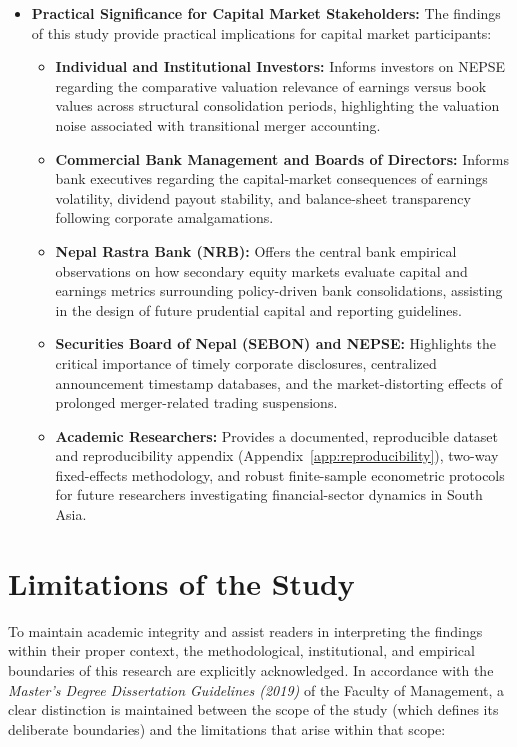 \begin{itemize}
\item \textbf{Practical Significance for Capital Market Stakeholders:}
The findings of this study provide practical implications for capital market participants:
\begin{itemize}
\item \textbf{Individual and Institutional Investors:} Informs investors on NEPSE regarding the comparative valuation relevance of earnings versus book values across structural consolidation periods, highlighting the valuation noise associated with transitional merger accounting.
\item \textbf{Commercial Bank Management and Boards of Directors:} Informs bank executives regarding the capital-market consequences of earnings volatility, dividend payout stability, and balance-sheet transparency following corporate amalgamations.
\item \textbf{Nepal Rastra Bank (NRB):} Offers the central bank empirical observations on how secondary equity markets evaluate capital and earnings metrics surrounding policy-driven bank consolidations, assisting in the design of future prudential capital and reporting guidelines.
\item \textbf{Securities Board of Nepal (SEBON) and NEPSE:} Highlights the critical importance of timely corporate disclosures, centralized announcement timestamp databases, and the market-distorting effects of prolonged merger-related trading suspensions.
\item \textbf{Academic Researchers:} Provides a documented, reproducible dataset and reproducibility appendix (Appendix~\ref{app:reproducibility}), two-way fixed-effects methodology, and robust finite-sample econometric protocols for future researchers investigating financial-sector dynamics in South Asia.
\end{itemize}
\end{itemize}

\section{Limitations of the Study}
\label{sec:limitations}

To maintain academic integrity and assist readers in interpreting the findings within their proper context, the methodological, institutional, and empirical boundaries of this research are explicitly acknowledged. In accordance with the \textit{Master's Degree Dissertation Guidelines (2019)} of the Faculty of Management, a clear distinction is maintained between the scope of the study (which defines its deliberate boundaries) and the limitations that arise within that scope:

